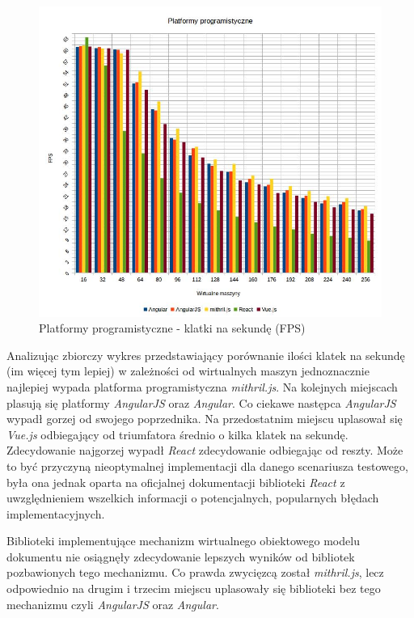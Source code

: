 \documentclass[polish, twoside, 12pt]{mwart}
\begin{document}
\begin{figure}[ht]
  \includegraphics[width=\textwidth]{frameworks-fps.jpg}
	\caption{Platformy programistyczne - klatki na sekundę (FPS)}
\end{figure}

Analizując zbiorczy wykres przedstawiający porównanie ilości klatek na sekundę (im więcej tym lepiej) w zależności od wirtualnych maszyn jednoznacznie najlepiej wypada platforma programistyczna \emph{mithril.js}. Na kolejnych miejscach plasują się platformy \emph{AngularJS} oraz \emph{Angular}. Co ciekawe następca \emph{AngularJS} wypadł gorzej od swojego poprzednika. Na przedostatnim miejscu uplasował się \emph{Vue.js} odbiegający od triumfatora średnio o kilka klatek na sekundę. Zdecydowanie najgorzej wypadł \emph{React} zdecydowanie odbiegając od reszty. Może to być przyczyną nieoptymalnej implementacji dla danego scenariusza testowego, była ona jednak oparta na oficjalnej dokumentacji biblioteki \emph{React} z uwzględnieniem wszelkich informacji o potencjalnych, popularnych błędach implementacyjnych. 

Biblioteki implementujące mechanizm wirtualnego obiektowego modelu dokumentu nie osiągnęły zdecydowanie lepszych wyników od bibliotek pozbawionych tego mechanizmu. Co prawda zwycięzcą został \emph{mithril.js}, lecz odpowiednio na drugim i trzecim miejscu uplasowały się biblioteki bez tego mechanizmu czyli \emph{AngularJS} oraz \emph{Angular}.
\end{document}
